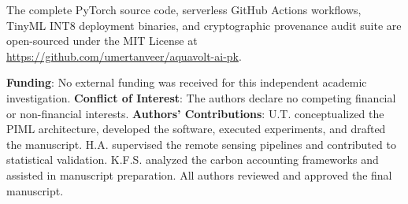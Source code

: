\documentclass[sn-mathphys-num,Numbered]{sn-jnl}
\begin{document}
The complete PyTorch source code, serverless GitHub Actions workflows, TinyML INT8 deployment binaries, and cryptographic provenance audit suite are open-sourced under the MIT License at \url{https://github.com/umertanveer/aquavolt-ai-pk}.

\textbf{Funding}: No external funding was received for this independent academic investigation.  
\textbf{Conflict of Interest}: The authors declare no competing financial or non-financial interests.  
\textbf{Authors' Contributions}: U.T. conceptualized the PIML architecture, developed the software, executed experiments, and drafted the manuscript. H.A. supervised the remote sensing pipelines and contributed to statistical validation. K.F.S. analyzed the carbon accounting frameworks and assisted in manuscript preparation. All authors reviewed and approved the final manuscript.
\end{document}

